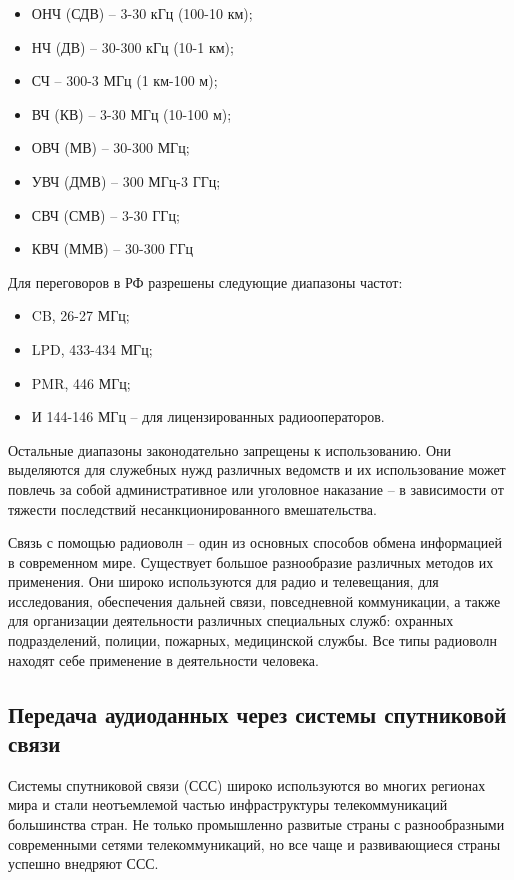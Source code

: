 \documentclass[a4paper]{report}
\begin{document}
\begin{itemize}
\item ОНЧ (СДВ) – 3-30 кГц (100-10 км);
\item НЧ (ДВ) – 30-300 кГц (10-1 км);
\item СЧ – 300-3 МГц (1 км-100 м);
\item ВЧ (КВ) – 3-30 МГц (10-100 м);
\item ОВЧ (МВ) – 30-300 МГц;
\item УВЧ (ДМВ) – 300 МГц-3 ГГц;
\item СВЧ (СМВ) – 3-30 ГГц;
\item КВЧ (ММВ) – 30-300 ГГц
\end{itemize}

Для переговоров в РФ разрешены следующие диапазоны частот:

\begin{itemize}
\item CB, 26-27 МГц;
\item LPD, 433-434 МГц;
\item PMR, 446 МГц;
\item И 144-146 МГц – для лицензированных радиооператоров.
\end{itemize}

Остальные диапазоны законодательно запрещены к использованию. Они выделяются для служебных нужд различных ведомств и их использование может повлечь за собой административное или уголовное наказание – в зависимости от тяжести последствий несанкционированного вмешательства.

Связь с помощью радиоволн – один из основных способов обмена информацией в современном мире. Существует большое разнообразие различных методов их применения. Они широко используются для радио и телевещания, для исследования, обеспечения дальней связи, повседневной коммуникации, а также для организации деятельности различных специальных служб: охранных подразделений, полиции, пожарных, медицинской службы. Все типы радиоволн находят себе применение в деятельности человека.

\subsection{Передача аудиоданных через системы спутниковой связи}

Системы спутниковой связи (ССС) широко используются во многих регионах мира и стали неотъемлемой частью инфраструктуры телекоммуникаций большинства стран. Не только промышленно развитые страны с разнообразными современными сетями телекоммуникаций, но все чаще и развивающиеся страны успешно внедряют ССС. 
\end{document}
